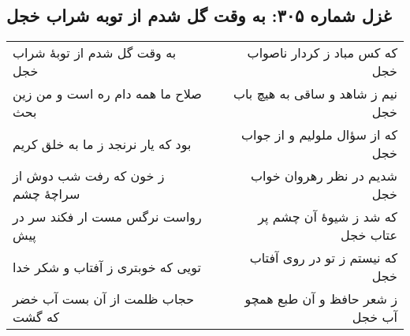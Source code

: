 \begin{center}
\section*{غزل شماره ۳۰۵: به وقت گل شدم از توبه شراب خجل}
\label{sec:sh305}
\begin{longtable}{l p{0.5cm} r}
به وقت گل شدم از توبهٔ شراب خجل
&&
که کس مباد ز کردار ناصواب خجل
\\
صلاح ما همه دام ره است و من زین بحث
&&
نیم ز شاهد و ساقی به هیچ باب خجل
\\
بود که یار نرنجد ز ما به خلق کریم
&&
که از سؤال ملولیم و از جواب خجل
\\
ز خون که رفت شب دوش از سراچهٔ چشم
&&
شدیم در نظر رهروان خواب خجل
\\
رواست نرگس مست ار فکند سر در پیش
&&
که شد ز شیوهٔ آن چشم پر عتاب خجل
\\
تویی که خوبتری ز آفتاب و شکر خدا
&&
که نیستم ز تو در روی آفتاب خجل
\\
حجاب ظلمت از آن بست آب خضر که گشت
&&
ز شعر حافظ و آن طبع همچو آب خجل
\\
\end{longtable}
\end{center}
